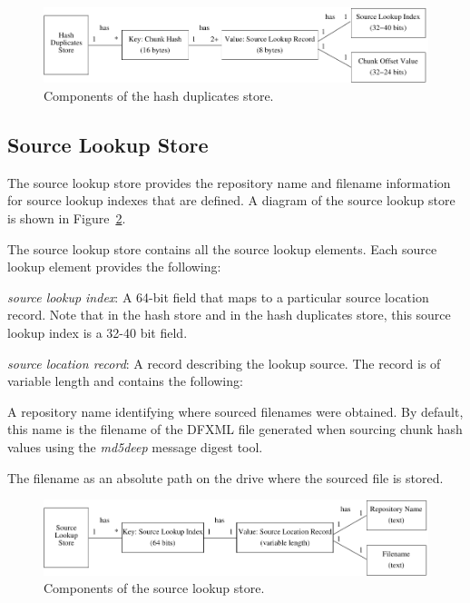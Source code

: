 \documentclass[10pt,twoside]{article}
\newcommand{\mdd}{\emph{md5deep}\xspace}
\begin{document}
\begin{figure}[h]
  \center
  \includegraphics{images/hash_duplicates_store}
  \caption{Components of the hash duplicates store.\label{fig-hash-duplicates-store}}
\end{figure}

\subsection{Source Lookup Store\label{source-lookup-store}}
The source lookup store provides the repository name and filename information
for source lookup indexes that are defined.
A diagram of the source lookup store is shown in Figure~\ref{fig-source-lookup-store}.

The source lookup store contains all the source lookup elements.
Each source lookup element provides the following:
\begin{compactitem}
\item \emph{source lookup index}: A 64-bit field
that maps to a particular source location record.
Note that in the hash store and in the hash duplicates store,
this source lookup index is a 32-40 bit field.
\item \emph{source location record}: A record describing the lookup source.
The record is of variable length and contains the following:
\begin{compactitem}
\item A repository name identifying where sourced filenames were obtained.
By default, this name is the filename of the DFXML file generated
when sourcing chunk hash values using the \mdd message digest tool.
\item The filename as an absolute path on the drive where the sourced file is stored.
\end{compactitem}
\end{compactitem}

\begin{figure}[h]
  \center
  \includegraphics{images/source_lookup_store}
  \caption{Components of the source lookup store.\label{fig-source-lookup-store}}
\end{figure}
\end{document}
